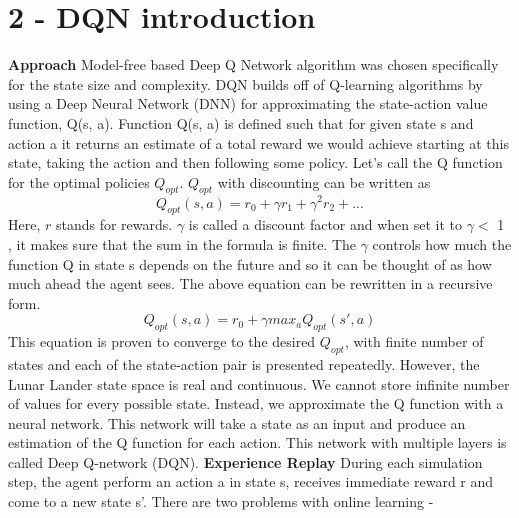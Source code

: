 \documentclass[12pt]{article}
\begin{document}
\section*{2 - DQN introduction}
\textbf{Approach} \newline \newline
Model-free based Deep Q Network algorithm was chosen specifically for the state size and complexity. DQN builds off of Q-learning algorithms by using a Deep Neural Network (DNN) for approximating the state-action value function, Q(s, a). Function Q(s, a) is defined such that for given state s and action a it returns an estimate of a total reward we would achieve starting at this state, taking the action and then following some policy. Let’s call the Q function for the optimal policies $Q_{opt}$.
 $Q_{opt}$ with discounting can be written as 
 \begin{equation}
Q_{opt}(s,a) = r_{0} + \gamma r_{1} + \gamma^{2} r_{2} + ...
\end{equation}
Here, $r$ stands for rewards. $\gamma$ is called a discount factor and when set it to $\gamma < $  1 , it makes sure that the sum in the formula is finite. The $\gamma$ controls how much the function Q in state s depends on the future and so it can be thought of as how much ahead the agent sees.  \newline
The above equation can be rewritten in a recursive form.
 \begin{equation}
Q_{opt}(s,a) = r_{0} + \gamma max_{a}Q_{opt}(s',a)
\end{equation}
This equation is proven to converge to the desired $Q_{opt}$, with finite number of states and each of the state-action pair is presented repeatedly. However, the Lunar Lander state space is real and continuous. We cannot store infinite number of values for every possible state. Instead, we  approximate the Q function with a neural network. This network will take a state as an input and produce an estimation of the Q function for each action. This network with multiple layers is called Deep Q-network (DQN).
\newline \newline
\textbf{Experience Replay} \newline \newline
During each simulation step, the agent perform an action a in state s, receives immediate reward r and come to a new state s’.
\newline
There are two problems with online learning - \newline
\end{document}
